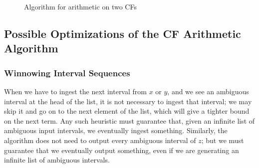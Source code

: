 \documentclass[11pt, oneside]{amsart}   	%
\begin{document}
\begin{figure}\label{fig:twoCFarith}
\begin{algorithmic}
\STATE{}
\STATE{}
\STATE{}
 
 
 
    \STATE{}
     \ELSE
         \STATE{$I_x \gets [1,\infty)$}
     \ENDIF
     \ELSE
         \STATE{$I_y \gets [1,\infty)$}
     \ENDIF
     
     \STATE{}
     \ELSE
     \ENDIF
\ENDWHILE
\end{algorithmic}
\caption{Algorithm for arithmetic on two CFs}
\end{figure}


\subsection{Possible Optimizations of the CF Arithmetic Algorithm}
\subsubsection{Winnowing Interval Sequences}
When we have to ingest the next interval from $x$ or $y$, and we see an ambiguous interval at the head of the list, it is not necessary
to ingest that interval; we may skip it and go on to the next element of the list, which will give a tighter bound on the next term. Any
such heuristic must guarantee that, given an infinite list of ambiguous input intervals, we eventually ingest something. Similarly, the
algorithm does not need to output every ambiguous interval of $z$; but  we must guarantee that we eventually output something,
even if we are generating an infinite list of ambiguous intervals.
\end{document}
